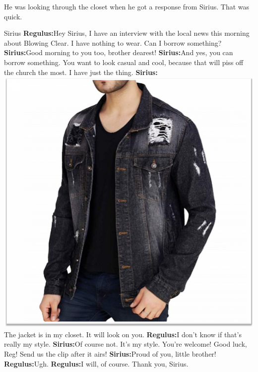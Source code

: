 \documentclass[12pt,twoside,openright]{memoir}
\begin{document}
He was looking through the closet when he got a response from Sirius. That was quick.

Sirius\newline
\textbf{Regulus:}Hey Sirius, I have an interview with the local news this morning about Blowing Clear. I have nothing to wear. Can I borrow something?\newline
\textbf{Sirius:}Good morning to you too, brother dearest!\newline
\textbf{Sirius:}And yes, you can borrow something. You want to look casual and cool, because that will piss off the church the most. I have just the thing.\newline
\textbf{Sirius:} {\centering\includegraphics[width=\textwidth]{denimjacket}}
 The jacket is in my closet. It will look  on you.\newline
\textbf{Regulus:}I don't know if that's really my style.\newline
\textbf{Sirius:}Of course not. It's my style. You're welcome!  Good luck, Reg! Send us the clip after it airs!\newline
\textbf{Sirius:}Proud of you, little brother!\newline
\textbf{Regulus:}Ugh.\newline
\textbf{Regulus:}I will, of course. Thank you, Sirius.
\end{document}

